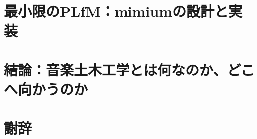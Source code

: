 \documentclass[luatex,unicode,titlepage,pdfusetitle,a4paper,openany]{ltjsbook}
\begin{document}
\chapter{最小限のPLfM：mimiumの設計と実装}\label{sec:chapter6}


\chapter{結論：音楽土木工学とは何なのか、どこへ向かうのか}\label{sec:chapter7}


% 

\printbibliography[title = 参考文献]

\chapter*{謝辞}

\end{document}
